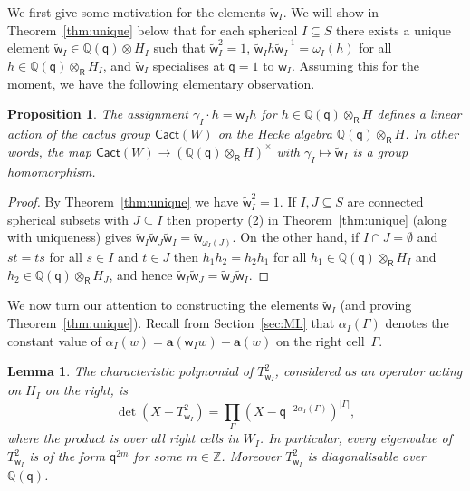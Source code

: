 \documentclass[11pt]{article}
\theoremstyle{plain}
\newtheorem{lemma}[thm]{Lemma}
\newtheorem{prop}[thm]{Proposition}
\theoremstyle{definition}
\numberwithin{equation}{section}
\def\tw{\widetilde{\mathsf{w}}_I}
\def\cact{\mathsf{Cact}}
\newcommand{\Ga}{\Gamma}
\def\QQ{\mathbb{Q}}
\def\ZZ{\mathbb{Z}}
\def\sR{\mathsf{R}}
\newcommand{\sw}{\mathsf{w}}
\newcommand{\ba}{\mathbf{a}}
\newcommand{\sq}{\mathsf{q}}
\begin{document}
We first give some motivation for the elements $\tw$. We will show in Theorem~\ref{thm:unique} below that for each spherical $I\subseteq S$ there exists a unique element $\tw\in\QQ(\sq)\otimes H_I$ such that $\tw^2=1$, $\tw h\tw^{-1}=\omega_I(h)$ for all $h\in\QQ(\sq)\otimes_{\sR} H_I$, and $\tw$ specialises at $\sq=1$ to $\sw_I$. Assuming this for the moment, we have the following elementary observation. 


\begin{prop}\label{prop:action} The assignment $\gamma_I\cdot h=\tw h$ for $h\in \QQ(\sq)\otimes_{\sR}H$ defines a linear action of the cactus group $\cact(W)$ on the Hecke algebra $\QQ(\sq)\otimes_{\sR}H$. In other words, the map $\cact(W)\to (\QQ(\sq)\otimes_{\sR}H)^{\times}$ with $\gamma_I\mapsto \tw$ is a group homomorphism. 
\end{prop}

\begin{proof} 
By Theorem~\ref{thm:unique} we have $\tw^2=1$. If $I,J\subseteq S$ are connected spherical subsets with $J\subseteq I$ then property (2) in Theorem~\ref{thm:unique} (along with uniqueness) gives
$
\tw\widetilde{\sw}_J\tw=\widetilde{\sw}_{\omega_I(J)}. 
$
On the other hand, if $I\cap J=\emptyset$ and $st=ts$ for all $s\in I$ and $t\in J$ then $h_1h_2=h_2h_1$ for all $h_1\in \QQ(\sq)\otimes_{\sR}H_I$ and $h_2\in \QQ(\sq)\otimes_{\sR}H_J$, and hence $\tw\widetilde{\sw}_J=\widetilde{\sw}_J\tw$. 
\end{proof}

We now turn our attention to constructing the elements $\tw$ (and proving Theorem~\ref{thm:unique}). Recall from Section~\ref{sec:ML} that $\alpha_I(\Ga)$ denotes the constant value of $\alpha_I(w)=\ba(\sw_Iw)-\ba(w)$ on the right cell~$\Ga$. 

\begin{lemma}\label{lem:eigenvalues}
The characteristic polynomial of $T_{\sw_I}^2$, considered as an operator acting on $H_I$ on the right, is 
$$
\det(X -T_{\sw_I}^2)=\prod_{\Ga}(X-\sq^{-2\alpha_I(\Ga)})^{|\Ga|},
$$
where the product is over all right cells in $W_I$. In particular, every eigenvalue of $T_{\sw_I}^2$ is of the form $\sq^{2m}$ for some $m\in\ZZ$. Moreover $T_{\sw_I}^2$ is diagonalisable over~$\QQ(\sq)$.
\end{lemma}
\end{document}
